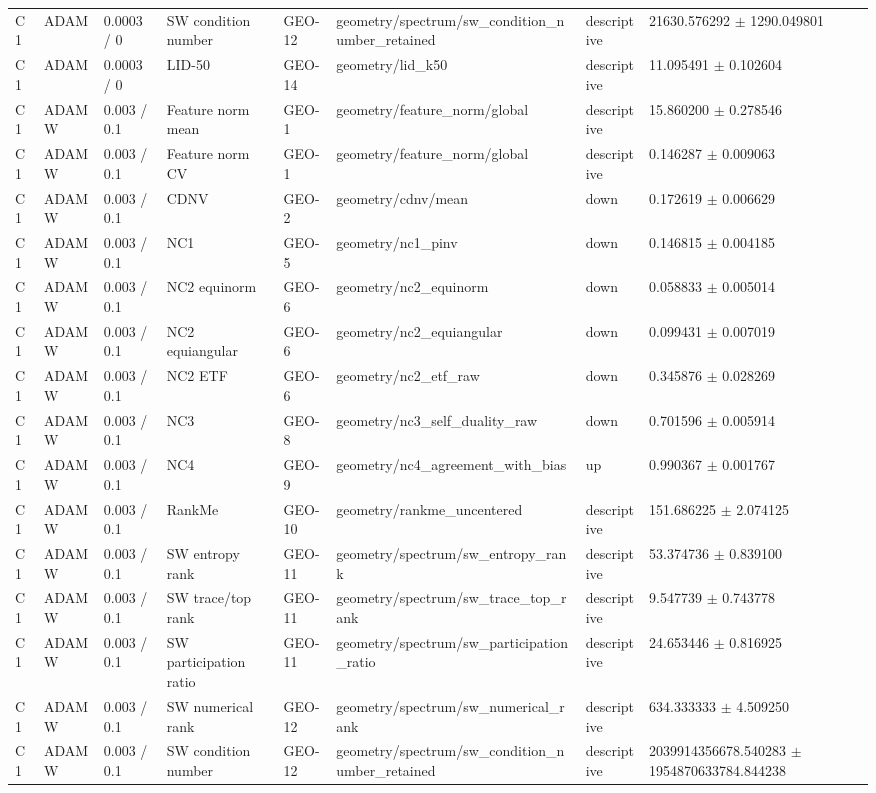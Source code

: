 \begin{longtable}{llllllll}
C1 & ADAM & 0.0003 / 0 & SW condition number & GEO-12 & geometry/spectrum/sw\_condition\_number\_retained & descriptive & 21630.576292 $\pm$ 1290.049801 \\
C1 & ADAM & 0.0003 / 0 & LID-50 & GEO-14 & geometry/lid\_k50 & descriptive & 11.095491 $\pm$ 0.102604 \\
C1 & ADAMW & 0.003 / 0.1 & Feature norm mean & GEO-1 & geometry/feature\_norm/global & descriptive & 15.860200 $\pm$ 0.278546 \\
C1 & ADAMW & 0.003 / 0.1 & Feature norm CV & GEO-1 & geometry/feature\_norm/global & descriptive & 0.146287 $\pm$ 0.009063 \\
C1 & ADAMW & 0.003 / 0.1 & CDNV & GEO-2 & geometry/cdnv/mean & down & 0.172619 $\pm$ 0.006629 \\
C1 & ADAMW & 0.003 / 0.1 & NC1 & GEO-5 & geometry/nc1\_pinv & down & 0.146815 $\pm$ 0.004185 \\
C1 & ADAMW & 0.003 / 0.1 & NC2 equinorm & GEO-6 & geometry/nc2\_equinorm & down & 0.058833 $\pm$ 0.005014 \\
C1 & ADAMW & 0.003 / 0.1 & NC2 equiangular & GEO-6 & geometry/nc2\_equiangular & down & 0.099431 $\pm$ 0.007019 \\
C1 & ADAMW & 0.003 / 0.1 & NC2 ETF & GEO-6 & geometry/nc2\_etf\_raw & down & 0.345876 $\pm$ 0.028269 \\
C1 & ADAMW & 0.003 / 0.1 & NC3 & GEO-8 & geometry/nc3\_self\_duality\_raw & down & 0.701596 $\pm$ 0.005914 \\
C1 & ADAMW & 0.003 / 0.1 & NC4 & GEO-9 & geometry/nc4\_agreement\_with\_bias & up & 0.990367 $\pm$ 0.001767 \\
C1 & ADAMW & 0.003 / 0.1 & RankMe & GEO-10 & geometry/rankme\_uncentered & descriptive & 151.686225 $\pm$ 2.074125 \\
C1 & ADAMW & 0.003 / 0.1 & SW entropy rank & GEO-11 & geometry/spectrum/sw\_entropy\_rank & descriptive & 53.374736 $\pm$ 0.839100 \\
C1 & ADAMW & 0.003 / 0.1 & SW trace/top rank & GEO-11 & geometry/spectrum/sw\_trace\_top\_rank & descriptive & 9.547739 $\pm$ 0.743778 \\
C1 & ADAMW & 0.003 / 0.1 & SW participation ratio & GEO-11 & geometry/spectrum/sw\_participation\_ratio & descriptive & 24.653446 $\pm$ 0.816925 \\
C1 & ADAMW & 0.003 / 0.1 & SW numerical rank & GEO-12 & geometry/spectrum/sw\_numerical\_rank & descriptive & 634.333333 $\pm$ 4.509250 \\
C1 & ADAMW & 0.003 / 0.1 & SW condition number & GEO-12 & geometry/spectrum/sw\_condition\_number\_retained & descriptive & 2039914356678.540283 $\pm$ 1954870633784.844238 \\

\end{longtable}

